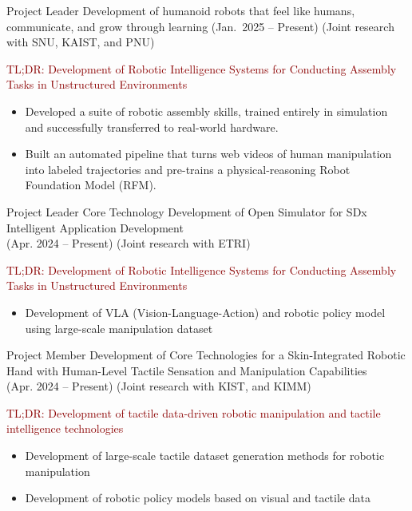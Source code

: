\documentclass[9pt]{developercv} %
\begin{document}
\begin{entrylist}

    \entry
		{Project Leader}
		{Development of humanoid robots that feel like humans, communicate, and grow through learning}
          {(Jan.\ 2025 -- Present) (Joint research with SNU, KAIST, and PNU)}
		{%
            \textcolor{darkred}{TL;DR: Development of Robotic Intelligence Systems for Conducting Assembly Tasks in Unstructured Environments}
            \begin{itemize}
              \item Developed a suite of robotic assembly skills, trained entirely in simulation and successfully transferred to real-world hardware.
               \item Built an automated pipeline that turns web videos of human manipulation into labeled trajectories and pre-trains a physical-reasoning Robot Foundation Model (RFM).
            \end{itemize}
            }


    \entry
		{Project Leader}
		{Core Technology Development of Open Simulator for SDx Intelligent Application Development}
		{\\(Apr. 2024 -- Present) (Joint research with ETRI)}
		{%
        \textcolor{darkred}{TL;DR: Development of Robotic Intelligence Systems for Conducting Assembly Tasks in Unstructured Environments}
            \begin{itemize}
                \item Development of VLA (Vision-Language-Action) and robotic policy model using large-scale manipulation dataset
            \end{itemize}
            }

    \entry
		{Project Member}
		{Development of Core Technologies for a Skin-Integrated Robotic Hand with Human-Level Tactile Sensation and Manipulation Capabilities}
		{\\(Apr. 2024 -- Present) (Joint research with KIST, and KIMM)}
		{%
        \textcolor{darkred}{TL;DR: Development of tactile data-driven robotic manipulation and tactile intelligence technologies}
            \begin{itemize}
                \item Development of large-scale tactile dataset generation methods for robotic manipulation
                \item Development of robotic policy models based on visual and tactile data
            \end{itemize}
            }


\end{entrylist}
\end{document}
